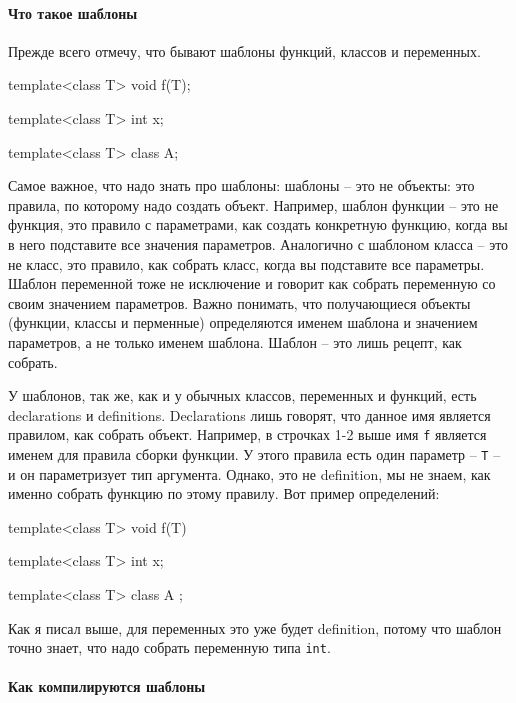 \paragraph{Что такое шаблоны}
Прежде всего отмечу, что бывают шаблоны функций, классов и переменных.
\begin{cppcode}
template<class T>
void f(T);

template<class T>
int x;

template<class T>
class A;
\end{cppcode}
Самое важное, что надо знать про шаблоны: шаблоны -- это не объекты: это правила, по которому надо создать объект.
Например, шаблон функции -- это не функция, это правило с параметрами, как создать конкретную функцию, когда вы в него подставите все значения параметров.
Аналогично с шаблоном класса -- это не класс, это правило, как собрать класс, когда вы подставите все параметры.
Шаблон переменной тоже не исключение и говорит как собрать переменную со своим значением параметров.
Важно понимать, что получающиеся объекты (функции, классы и перменные) определяются именем шаблона и значением параметров, а не только именем шаблона.
Шаблон -- это лишь рецепт, как собрать.

У шаблонов, так же, как и у обычных классов, переменных и функций, есть declarations и definitions.
Declarations лишь говорят, что данное имя является правилом, как собрать объект.
Например, в строчках 1-2 выше имя \verb"f" является именем для правила сборки функции.
У этого правила есть один параметр -- \verb"T" -- и он параметризует тип аргумента.
Однако, это не definition, мы не знаем, как именно собрать функцию по этому правилу.
Вот пример определений:
\begin{cppcode}
template<class T>
void f(T) {}

template<class T>
int x;

template<class T>
class A {};
\end{cppcode}
Как я писал выше, для переменных это уже будет definition, потому что шаблон точно знает, что надо собрать переменную типа \verb"int".

\paragraph{Как компилируются шаблоны}


